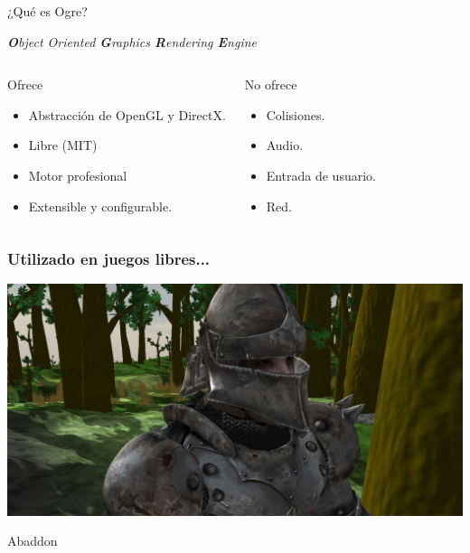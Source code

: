\documentclass[green]{beamer}
\begin{document}

\begin{frame}{¿Qué es Ogre?}    
    \begin{center}
	\emph{\textbf{\huge{O}}bject Oriented \textbf{\huge{G}}raphics \textbf{\huge{R}}endering \textbf{\huge{E}}ngine}
    \end{center}

    \begin{columns}[t]
    \column{150pt}
	\begin{block}{Ofrece}
            \begin{itemize}
                \item Abstracción de OpenGL y DirectX.
		\item Libre (MIT)
                \item Motor profesional
                \item Extensible y configurable.
            \end{itemize}            
        \end{block}

    \column{150pt}
	\begin{alertblock}{No ofrece}
            \begin{itemize}
                \item Colisiones.
		\item Audio.
                \item Entrada de usuario.
                \item Red.
            \end{itemize}            
        \end{alertblock}
    \end{columns} 
    
\end{frame}

\begin{frame}
    \frametitle{Utilizado en juegos libres...}
    
    \begin{center}
	\includegraphics[scale=0.18]{img/abaddon.jpg}
	    
	\tiny{Abaddon}
    \end{center}
\end{frame}
\end{document}
